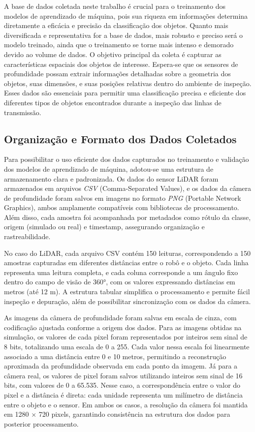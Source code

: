 A base de dados coletada neste trabalho é crucial para o treinamento dos modelos de aprendizado de máquina, pois sua riqueza em informações determina diretamente a eficácia e precisão da classificação dos objetos. Quanto mais diversificada e representativa for a base de dados, mais robusto e preciso será o modelo treinado, ainda que o treinamento se torne mais intenso e demorado devido ao volume de dados. O objetivo principal da coleta é capturar as características espaciais dos objetos de interesse. Espera-se que os sensores de profundidade possam extrair informações detalhadas sobre a geometria dos objetos, suas dimensões, e suas posições relativas dentro do ambiente de inspeção. Esses dados são essenciais para permitir uma classificação precisa e eficiente dos diferentes tipos de objetos encontrados durante a inspeção das linhas de transmissão.

\subsection{Organização e Formato dos Dados Coletados}

Para possibilitar o uso eficiente dos dados capturados no treinamento e validação dos modelos de aprendizado de máquina, adotou-se uma estrutura de armazenamento clara e padronizada. Os dados do sensor LiDAR foram armazenados em arquivos \textit{CSV} (Comma-Separated Values), e os dados da câmera de profundidade foram salvos em imagens no formato \textit{PNG} (Portable Network Graphics), ambos amplamente compatíveis com bibliotecas de processamento. Além disso, cada amostra foi acompanhada por metadados como rótulo da classe, origem (simulado ou real) e timestamp, assegurando organização e rastreabilidade.

No caso do LiDAR, cada arquivo CSV contém 150 leituras, correspondendo a 150 amostras capturadas em diferentes distâncias entre o robô e o objeto. Cada linha representa uma leitura completa, e cada coluna corresponde a um ângulo fixo dentro do campo de visão de 360°, com os valores expressando distâncias em metros (até 12 m). A estrutura tabular simplifica o processamento e permite fácil inspeção e depuração, além de possibilitar sincronização com os dados da câmera.

As imagens da câmera de profundidade foram salvas em escala de cinza, com codificação ajustada conforme a origem dos dados. Para as imagens obtidas na simulação, os valores de cada pixel foram representados por inteiros sem sinal de 8 bits, totalizando uma escala de 0 a 255. Cada valor nessa escala foi linearmente associado a uma distância entre 0 e 10 metros, permitindo a reconstrução aproximada da profundidade observada em cada ponto da imagem. Já para a câmera real, os valores de pixel foram salvos utilizando inteiros sem sinal de 16 bits, com valores de 0 a 65.535. Nesse caso, a correspondência entre o valor do pixel e a distância é direta: cada unidade representa um milímetro de distância entre o objeto e o sensor. Em ambos os casos, a resolução da câmera foi mantida em 1280 × 720 pixels, garantindo consistência na estrutura dos dados para posterior processamento.

